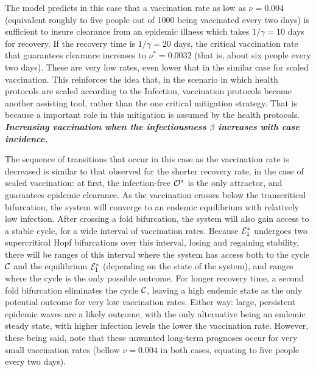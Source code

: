 \documentclass[10pt]{article}
\begin{document}
The model predicts in this case that a vaccination rate as low as $\nu=0.004$ (equivalent roughly to five people out of 1000 being vaccinated every two days) is sufficient to insure clearance from an epidemic illness which takes $1/\gamma =10$ days for recovery. If the recovery time is $1/\gamma = 20$ days, the critical vaccination rate that guarantees clearance increases to $\nu^* = 0.0032$ (that is, about six people every two days). These are very low rates, even lower that in the similar case for scaled vaccination. This reinforces the idea that, in the scenario in which health protocols are scaled according to the Infection, vaccination protocols become another assisting tool, rather than the one critical mitigation strategy. That is because a important role in this mitigation is assumed by the health protocols. \\

\noindent \textbf{\emph{ Increasing vaccination when the infectiousness $\beta$ increases with case incidence.}} 

\noindent The sequence of transitions that occur in this case as the vaccination rate is decreased is similar to that observed for the shorter recovery rate, in the case of scaled vaccination: at first, the infection-free ${\cal O}^*$ is the only attractor, and guarantees epidemic clearance. As the vaccination crosses below the transcritical bifurcation, the system will converge to an endemic equilibrium with relatively low infection. After crossing a fold bifurcation, the system will also gain access to a stable cycle, for a wide interval of vaccination rates. Because ${\cal E}^*_1$ undergoes two supercritical Hopf bifurcations over this interval, losing and regaining stability, there will be ranges of this interval where the system has access both to the cycle ${\cal C}$ and the equilibrium ${\cal E}^*_1$ (depending on the state of the system), and ranges where the cycle is the only possible outcome. For longer recovery time, a second fold bifurcation eliminates the cycle ${\cal C}$, leaving a high endemic state as the only potential outcome for very low vaccination rates. Either way: large, persistent epidemic waves are a likely outcome, with the only alternative being an endemic steady state, with higher infection levels the lower the vaccination rate. However, these being said, note that these unwanted long-term prognoses occur for very small vaccination rates (bellow $\nu=0.004$ in both cases, equating to five people every two days). 
\end{document}
